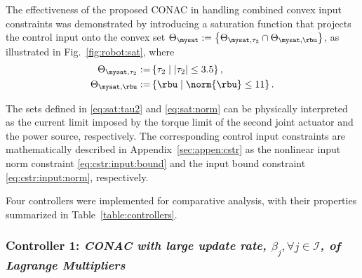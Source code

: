 \documentclass[journal]{IEEEtran}
\begin{document}
The effectiveness of the proposed CONAC in handling combined convex input constraints was demonstrated by introducing a saturation function that projects the control input onto the convex set $\Theta_{\mysat} :=\left\{ \Theta_{\mysat, {\tau_2}} \cap \Theta_{\mysat, {\rbu}} \right\}$, as illustrated in Fig.~\ref{fig:robot:sat}, where
\begin{subequations}
    \begin{align}
        \Theta_{\mysat, {\tau_2}}
        :=&
        \left\{
            \tau_2
            \mid
            \vert{\tau_2}\vert \le 
            3.5
        \right\}
        ,
        \label{eq:sat:tau2}
        \\    
        \Theta_{\mysat, {\rbu}}
        :=&
        \left\{
            \rbu
            \mid
            \norm{\rbu} \le 
            11
        \right\}
        .
        \label{eq:sat:norm}
    \end{align}
    \label{eq:sat}%
\end{subequations}

The sets defined in \eqref{eq:sat:tau2} and \eqref{eq:sat:norm} can be physically interpreted as the current limit imposed by the torque limit of the second joint actuator and the power source, respectively.
The corresponding control input constraints are mathematically described in Appendix~\ref{sec:appen:cstr} as the nonlinear input norm constraint \eqref{eq:cstr:input:bound} and the input bound constraint \eqref{eq:cstr:input:norm}, respectively.


\hfill

Four controllers were implemented for comparative analysis, with their properties summarized in Table~\ref{table:controllers}.

\subsubsection*{Controller 1:  \textit{CONAC with large update rate, $\beta_j,\forall j\in\mathcal{I}$, of Lagrange Multipliers}}
\end{document}
